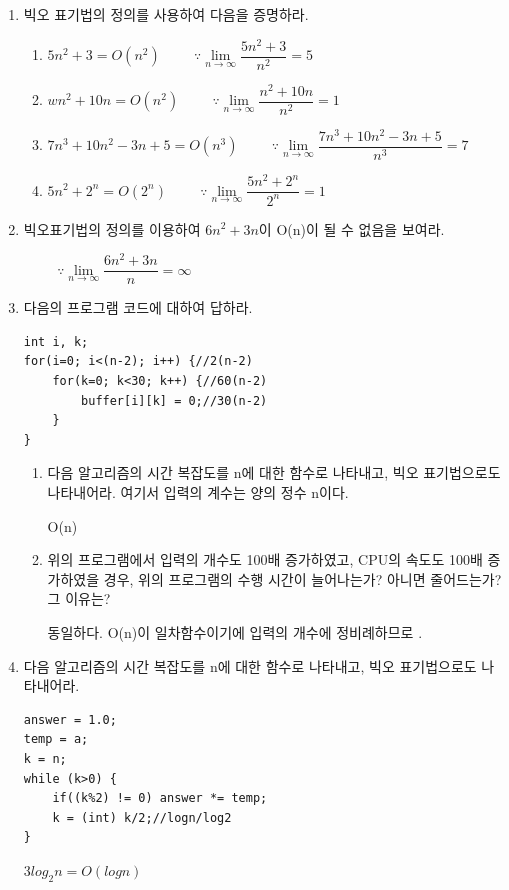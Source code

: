 \documentclass[11pt,a4paper]{article}
\begin{document}
\begin{enumerate}
\item 빅오 표기법의 정의를 사용하여 다음을 증명하라.
\begin{enumerate}
	\item $5n^2+3=O(n^2)\hspace{1cm} 
	\because \lim\limits_{n\to\infty}\dfrac{5n^2+3}{n^2}=5$
	\item $wn^2+10n=O(n^2) \hspace{1cm} 
	\because \lim\limits_{n\to\infty}\dfrac{n^2+10n}{n^2}=1$
	\item $7n^3+10n^2-3n+5=O(n^3)\hspace{1cm} 
	\because \lim\limits_{n\to\infty}\dfrac{7n^3+10n^2-3n+5}{n^3}=7$
	\item $5n^2+2^n=O(2^n)\hspace{1cm} 
	\because \lim\limits_{n\to\infty}\dfrac{5n^2+2^n}{2^n}=1$
\end{enumerate}
\item 빅오표기법의 정의를 이용하여 $6n^2+3n$이 O(n)이 될 수 없음을 보여라.

$\hspace{1cm} 
\because \lim\limits_{n\to\infty}\dfrac{6n^2+3n}{n}=\infty$

\item 다음의 프로그램 코드에 대하여 답하라.
\begin{lstlisting}
int i, k;
for(i=0; i<(n-2); i++) {//2(n-2)
	for(k=0; k<30; k++) {//60(n-2)
		buffer[i][k] = 0;//30(n-2)
	}
}

\end{lstlisting}
\begin{enumerate}
	\item 다음 알고리즘의 시간 복잡도를 n에 대한 함수로 나타내고, 빅오 표기법으로도 나타내어라. 여기서 입력의 계수는 양의 정수 n이다.
	
	O(n)
	\item 위의 프로그램에서 입력의 개수도 100배 증가하였고, CPU의 속도도 100배 증가하였을 경우, 위의 프로그램의 수행 시간이 늘어나는가? 아니면 줄어드는가? 그 이유는?
	
	동일하다. O(n)이 일차함수이기에 입력의 개수에 정비례하므로 . 
\end{enumerate}
\item 다음 알고리즘의 시간 복잡도를 n에 대한 함수로 나타내고, 빅오 표기법으로도 나타내어라.
\begin{lstlisting}
answer = 1.0;
temp = a;
k = n;
while (k>0) {
	if((k%2) != 0) answer *= temp;
	k = (int) k/2;//logn/log2
}
\end{lstlisting}
$3log_2n=O(logn)$


\end{enumerate}
\end{document}
